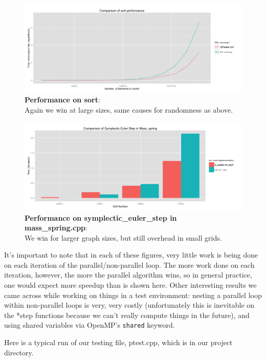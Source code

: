 \documentclass{article}
\begin{document}
     \begin{figure}[h!]
    \centering
\includegraphics[scale = 0.4]{sort_comparison}
    \caption{\textbf{Performance on sort}:\\ Again we win at large sizes, same causes for randomness as above.}
    \end{figure}
 \newpage

		\begin{figure}[t!]
		\centering
		\includegraphics[scale = 0.4]{symplectic_comparison}
		\caption{\textbf{Performance on symplectic\_euler\_step in mass\_spring.cpp}:\\ We win for larger graph sizes, but still overhead in small grids.}
		\end{figure}


It's important to note that in each of these figures, very little work is being done on each iteration of the parallel/non-parallel loop.  The more work done on each iteration, however, the more the parallel algorithm wins, so in general practice, one would expect more speedup than is shown here.  Other interesting results we came across while working on things in a test environment: nesting a parallel loop within non-parallel loops is very, very costly (unfortunately this is inevitable on the *step functions because we can't really compute things in the future), and using shared variables via OpenMP's \texttt{shared} keyword.

Here is a typical run of our testing file, ptest.cpp, which is in our project directory.
\end{document}
